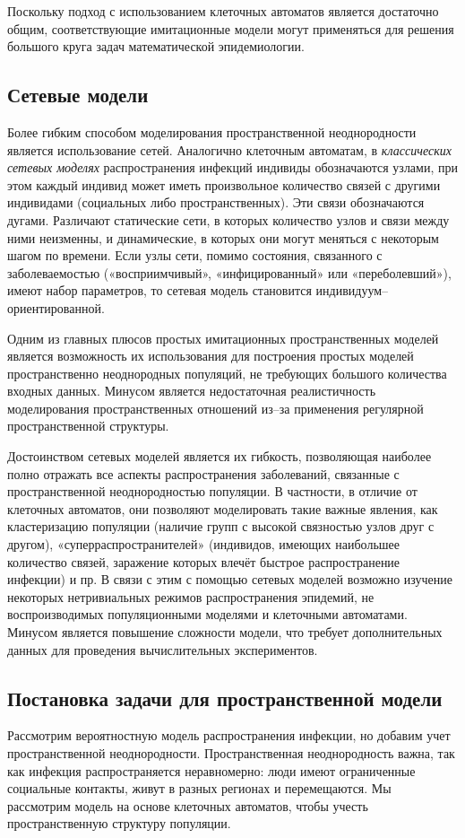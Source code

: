 \documentclass[a4paper, 14pt]{extreport}
\numberwithin{equation}{section}
\begin{document}
	Поскольку подход с использованием клеточных автоматов является
	достаточно общим, соответствующие имитационные модели могут
	применяться для решения большого круга задач математической
	эпидемиологии. 
	
	\subsection{Сетевые модели}
	
	Более гибким способом моделирования пространственной неоднородности
	является использование сетей. Аналогично клеточным автоматам, в
	\textit{классических сетевых моделях} распространения инфекций индивиды
	обозначаются узлами, при этом каждый индивид может иметь произвольное
	количество связей с другими индивидами (социальных либо пространственных).
	Эти связи обозначаются дугами. Различают статические сети, в которых
	количество узлов и связи между ними неизменны, и динамические, в которых
	они могут меняться с некоторым шагом по времени. Если узлы сети, помимо
	состояния, связанного с заболеваемостью («восприимчивый»,
	«инфицированный» или «переболевший»), имеют набор параметров, то сетевая
	модель становится индивидуум–ориентированной.
	
	Одним из главных плюсов простых
	имитационных пространственных моделей является возможность их
	использования для построения простых моделей пространственно
	неоднородных популяций, не требующих большого количества входных
	данных. Минусом является недостаточная реалистичность моделирования
	пространственных отношений из–за применения регулярной пространственной
	структуры.
	
	Достоинством сетевых моделей является их гибкость, позволяющая
	наиболее полно отражать все аспекты распространения заболеваний, связанные
	с пространственной неоднородностью популяции. В частности, в отличие от
	клеточных автоматов, они позволяют моделировать такие важные явления, как
	кластеризацию популяции (наличие групп с высокой связностью узлов друг с
	другом), «суперраспространителей» (индивидов, имеющих наибольшее
	количество связей, заражение которых влечёт быстрое распространение
	инфекции) и пр. В связи с этим с помощью сетевых моделей возможно
	изучение некоторых нетривиальных режимов распространения эпидемий, не
	воспроизводимых популяционными моделями и клеточными автоматами.
	Минусом является повышение сложности модели, что требует дополнительных
	данных для проведения вычислительных экспериментов.
	\subsection{Постановка задачи для пространственной модели}
	Рассмотрим вероятностную модель распространения инфекции, но добавим учет пространственной неоднородности. Пространственная неоднородность важна, так как инфекция распространяется неравномерно: люди имеют ограниченные социальные контакты, живут в разных регионах и перемещаются. Мы рассмотрим модель на основе клеточных автоматов, чтобы учесть пространственную структуру популяции.
	
\end{document}
